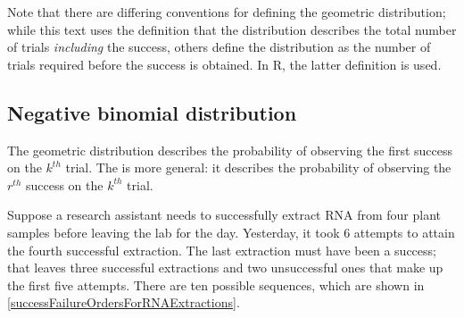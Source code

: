 Note that there are differing conventions for defining the geometric distribution; while this text uses the definition that the distribution describes the total number of trials \textit{including} the success, others define the distribution as the number of trials required before the success is obtained. In \textsf{R}, the latter definition is used. 



\subsection{Negative binomial distribution}
\label{negativeBinomial}


The geometric distribution describes the probability of observing the first success on the $k^{th}$ trial. The  is more general: it describes the probability of observing the $r^{th}$ success on the $k^{th}$ trial.

Suppose a research assistant needs to successfully extract RNA from four plant samples before leaving the lab for the day. Yesterday, it took 6 attempts to attain the fourth successful extraction. The last extraction must have been a success; that leaves three successful extractions and two unsuccessful ones that make up the first five attempts. There are ten possible sequences, which are shown in \ref{successFailureOrdersForRNAExtractions}. 

